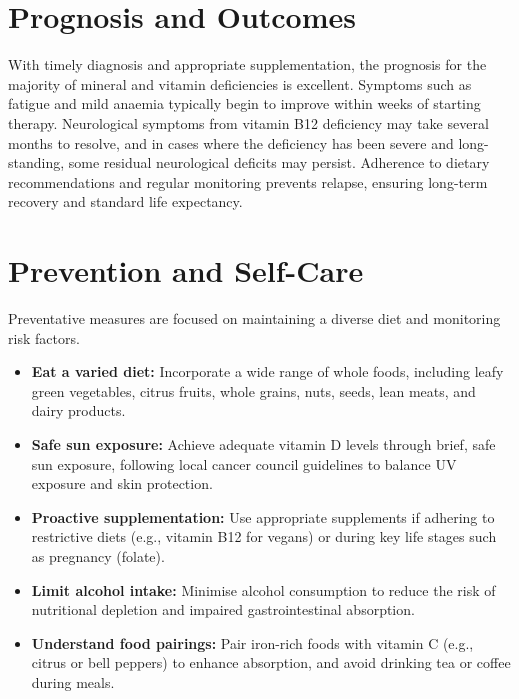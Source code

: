 \section*{Prognosis and Outcomes}
With timely diagnosis and appropriate supplementation, the prognosis for the majority of mineral and vitamin deficiencies is excellent. Symptoms such as fatigue and mild anaemia typically begin to improve within weeks of starting therapy. Neurological symptoms from vitamin B12 deficiency may take several months to resolve, and in cases where the deficiency has been severe and long-standing, some residual neurological deficits may persist. Adherence to dietary recommendations and regular monitoring prevents relapse, ensuring long-term recovery and standard life expectancy.

\section*{Prevention and Self-Care}
Preventative measures are focused on maintaining a diverse diet and monitoring risk factors.
\begin{itemize}
    \item \textbf{Eat a varied diet:} Incorporate a wide range of whole foods, including leafy green vegetables, citrus fruits, whole grains, nuts, seeds, lean meats, and dairy products.
    \item \textbf{Safe sun exposure:} Achieve adequate vitamin D levels through brief, safe sun exposure, following local cancer council guidelines to balance UV exposure and skin protection.
    \item \textbf{Proactive supplementation:} Use appropriate supplements if adhering to restrictive diets (e.g., vitamin B12 for vegans) or during key life stages such as pregnancy (folate).
    \item \textbf{Limit alcohol intake:} Minimise alcohol consumption to reduce the risk of nutritional depletion and impaired gastrointestinal absorption.
    \item \textbf{Understand food pairings:} Pair iron-rich foods with vitamin C (e.g., citrus or bell peppers) to enhance absorption, and avoid drinking tea or coffee during meals.
\end{itemize}

